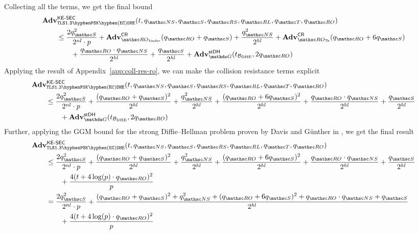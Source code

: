 	Collecting all the terms, we get the final bound
	\begin{align*}
		&\genAdv{\KESEC}{\TLSPSKECDHE}{t, \qNewSecret, \qSend, \qRevSessionKey, \qRevLongTermKey, \qTest, \qRO} \\
		&\qquad\leq \frac{2\qSend^2}{2^{\nl} \cdot p} + \genAdv{\CollRes}{\RObinder}{\qRO + \qSend} + \frac{\qNewSecret^2}{2^{\hashlen}} + \genAdv{\CollRes}{\ROthash}{\qRO + 6\qSend} \\
		&\qquad\qquad + \frac{\qRO \cdot \qNewSecret}{2^{\hashlen}} + \frac{\qSend}{2^{\hashlen}} + \genAdv{\stDH}{\G}{t_{\advB_\dhe}, 2 \qRO}
	\end{align*}
	Applying the result of Appendix~\ref{app:coll-res-ro}, we can make the collision resistance terms explicit
	\begin{align*}
		&\genAdv{\KESEC}{\TLSPSKECDHE}{t, \qNewSecret, \qSend, \qRevSessionKey, \qRevLongTermKey, \qTest, \qRO} \\
		&\qquad\leq \frac{2\qSend^2}{2^{\nl} \cdot p} + \frac{(\qRO+\qSend)^2}{2^{\hashlen}} + \frac{\qNewSecret^2}{2^{\hashlen}} + \frac{(\qRO+6\qSend)^2}{2^{\hashlen}} + \frac{\qRO \cdot \qNewSecret}{2^{\hashlen}} + \frac{\qSend}{2^{\hashlen}} \\
		&\qquad\qquad +  \genAdv{\stDH}{\G}{t_{\advB_\dhe}, 2 \qRO}
	\end{align*}
	Further, applying the GGM bound for the strong Diffie--Hellman problem proven by Davis and Günther in \cite{ACNS:DavGun21}, we get the final result
	\begin{align*}
		&\genAdv{\KESEC}{\TLSPSKECDHE}{t, \qNewSecret, \qSend, \qRevSessionKey, \qRevLongTermKey, \qTest, \qRO} \\
		&\qquad\leq \frac{2\qSend^2}{2^{\nl} \cdot p} + \frac{(\qRO+\qSend)^2}{2^{\hashlen}} + \frac{\qNewSecret^2}{2^{\hashlen}} + \frac{(\qRO+6\qSend)^2}{2^{\hashlen}} + \frac{\qRO \cdot \qNewSecret}{2^{\hashlen}} + \frac{\qSend}{2^{\hashlen}} \\
		&\qquad\qquad +  \frac{4(t + 4 \log(p) \cdot \qRO)^2}{p} \\
		&\qquad= \frac{2\qSend^2}{2^{\nl} \cdot p} + \frac{(\qRO+\qSend)^2 + \qNewSecret^2 + (\qRO+6\qSend)^2 + \qRO \cdot \qNewSecret + \qSend}{2^{\hashlen}} \\
		&\qquad\qquad +  \frac{4(t + 4 \log(p) \cdot \qRO)^2}{p}
	\end{align*}


